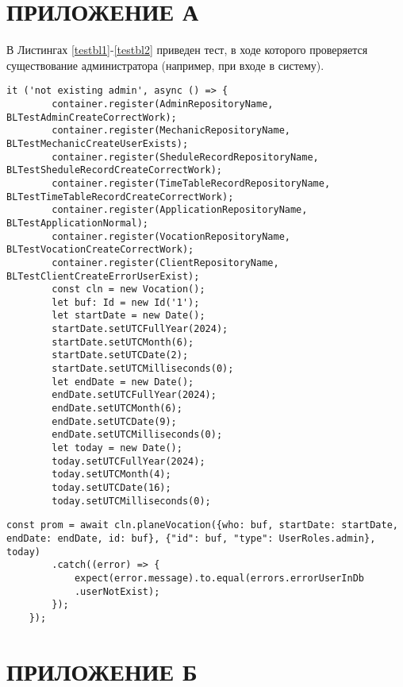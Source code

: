 \chapter*{ПРИЛОЖЕНИЕ  А}\label{chp:Appendix1}

\setcounter{lstlisting}{0}

\renewcommand\thelstlisting{А.\arabic{lstlisting}}

В Листингах \ref{testbl1}-\ref{testbl2} приведен тест, в ходе которого проверяется существование администратора (например, при входе в систему).

\begin{lstlisting}[label=testbl1, style=mystyle, caption={Тест, в ходе которого проверяется существование администратора (например, при входе в систему) (ч. 1)}]
	it ('not existing admin', async () => {
		container.register(AdminRepositoryName, BLTestAdminCreateCorrectWork);
		container.register(MechanicRepositoryName, BLTestMechanicCreateUserExists);
		container.register(SheduleRecordRepositoryName, BLTestSheduleRecordCreateCorrectWork);
		container.register(TimeTableRecordRepositoryName, BLTestTimeTableRecordCreateCorrectWork);
		container.register(ApplicationRepositoryName, BLTestApplicationNormal);
		container.register(VocationRepositoryName, BLTestVocationCreateCorrectWork);
		container.register(ClientRepositoryName, BLTestClientCreateErrorUserExist);
		const cln = new Vocation();
		let buf: Id = new Id('1');
		let startDate = new Date();
		startDate.setUTCFullYear(2024);
		startDate.setUTCMonth(6);
		startDate.setUTCDate(2);
		startDate.setUTCMilliseconds(0);
		let endDate = new Date();
		endDate.setUTCFullYear(2024);
		endDate.setUTCMonth(6);
		endDate.setUTCDate(9);
		endDate.setUTCMilliseconds(0);
		let today = new Date();
		today.setUTCFullYear(2024);
		today.setUTCMonth(4);
		today.setUTCDate(16);
		today.setUTCMilliseconds(0);
\end{lstlisting}
\newpage
\begin{lstlisting}[label=testbl2, style=mystyle, caption={Тест, в ходе которого проверяется существование администратора (например, при входе в систему) (ч. 2)}]
		const prom = await cln.planeVocation({who: buf, startDate: startDate, endDate: endDate, id: buf}, {"id": buf, "type": UserRoles.admin}, today)
		.catch((error) => {
			expect(error.message).to.equal(errors.errorUserInDb
			.userNotExist);
		});
	});
\end{lstlisting}

\chapter*{ПРИЛОЖЕНИЕ  Б}\label{chp:Appendix2}

